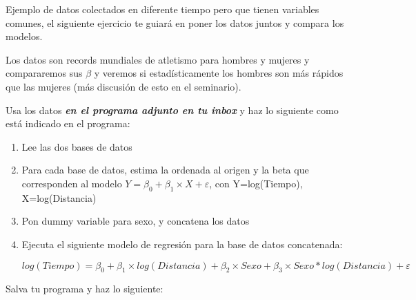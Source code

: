 \documentclass[letterpaper,11pt]{article}
\begin{document}
Ejemplo de datos colectados en diferente tiempo pero que tienen variables comunes, el siguiente ejercicio te 
guiar\'a en poner los datos juntos y compara los modelos.

Los datos son records mundiales de atletismo para hombres y mujeres y compararemos sus $\beta$ y
veremos si estad\'isticamente los hombres son m\'as r\'apidos que las mujeres (m\'as discusi\'on de esto en 
el seminario).

Usa los datos \textit{\textbf{en el programa adjunto en tu inbox}} y haz lo siguiente como est\'a indicado 
en el programa:

\begin{enumerate}	
\item Lee las dos bases de datos

\item Para cada base de datos, estima la ordenada al origen y la beta que corresponden al modelo
$Y=\beta_{0}+ \beta_{1} \times X+ \varepsilon$, con Y=log(Tiempo), X=log(Distancia)

\item Pon dummy variable para sexo, y concatena los datos

\item Ejecuta el siguiente modelo de regresi\'on para la base de datos concatenada:

$log(Tiempo)=\beta_{0}+ \beta_{1} \times log(Distancia)+ \beta_{2} \times Sexo+ \beta_{3} \times Sexo*log(
Distancia)+ \varepsilon$

\end{enumerate}	

Salva tu programa y haz lo siguiente:
\end{document}
